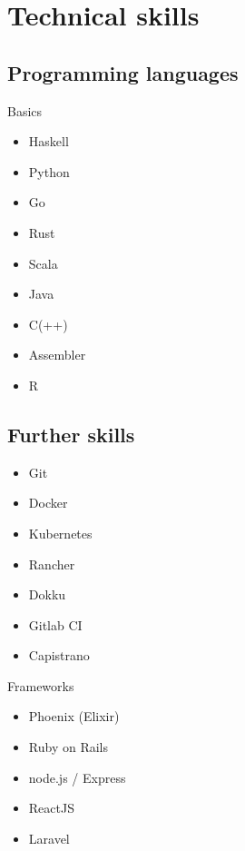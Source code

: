 \documentclass[11pt,a4paper,sans]{moderncv}        %
\begin{document}
\section{Technical skills}
\subsection{\textbf{Programming languages}}
\smallskip
{}
{Basics}{
\begin{itemize}
\item Haskell
\item Python
\item Go
\item Rust
\item Scala
\item Java
\item C(++)
\item Assembler
\item R
\end{itemize}}
\subsection{\textbf{Further skills}}
\smallskip
{}
{
\begin{itemize}
\item Git
\item Docker
\item Kubernetes
\item Rancher
\item Dokku
\item Gitlab CI
\item Capistrano
\end{itemize}
}
{Frameworks}
{
\begin{itemize}
\item Phoenix (Elixir)
\item Ruby on Rails
\item node.js / Express
\item ReactJS
\item Laravel
\end{itemize}
}

\medskip
\end{document}
